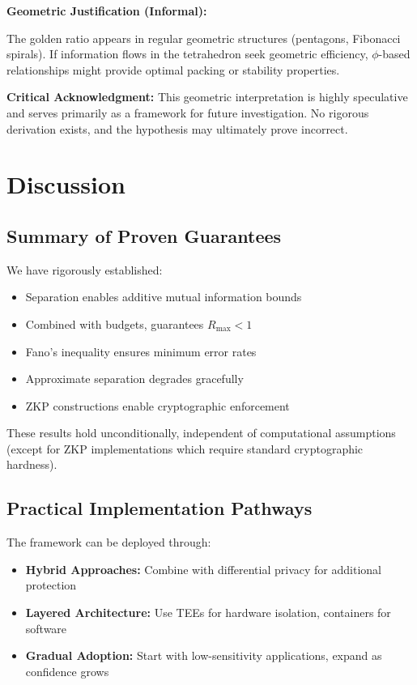 \documentclass[11pt,a4paper]{article}
\theoremstyle{definition}
\begin{document}
\textbf{Geometric Justification (Informal):}

The golden ratio appears in regular geometric structures (pentagons, Fibonacci spirals). If information flows in the tetrahedron seek geometric efficiency, $\phi$-based relationships might provide optimal packing or stability properties.

\textbf{Critical Acknowledgment:} This geometric interpretation is highly speculative and serves primarily as a framework for future investigation. No rigorous derivation exists, and the hypothesis may ultimately prove incorrect.

\section{Discussion}

\subsection{Summary of Proven Guarantees}

We have rigorously established:

\begin{itemize}
    \item Separation enables additive mutual information bounds
    \item Combined with budgets, guarantees $R_{\max} < 1$
    \item Fano's inequality ensures minimum error rates
    \item Approximate separation degrades gracefully
    \item ZKP constructions enable cryptographic enforcement
\end{itemize}

These results hold unconditionally, independent of computational assumptions (except for ZKP implementations which require standard cryptographic hardness).

\subsection{Practical Implementation Pathways}

The framework can be deployed through:

\begin{itemize}
    \item \textbf{Hybrid Approaches:} Combine with differential privacy for additional protection
    \item \textbf{Layered Architecture:} Use TEEs for hardware isolation, containers for software
    \item \textbf{Gradual Adoption:} Start with low-sensitivity applications, expand as confidence grows
\end{itemize}
\end{document}
